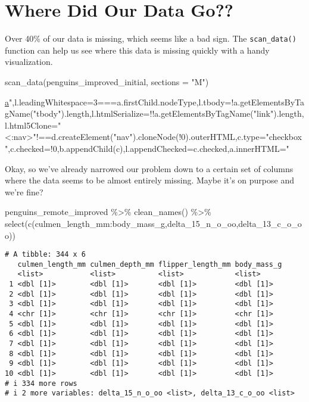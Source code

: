 \documentclass[
  letterpaper,
  DIV=11,
  numbers=noendperiod]{scrreprt}
\newenvironment{Shaded}{\begin{snugshade}}{\end{snugshade}}
\newcommand{\AttributeTok}[1]{\textcolor[rgb]{0.40,0.45,0.13}{#1}}
\newcommand{\FunctionTok}[1]{\textcolor[rgb]{0.28,0.35,0.67}{#1}}
\newcommand{\NormalTok}[1]{\textcolor[rgb]{0.00,0.23,0.31}{#1}}
\newcommand{\SpecialCharTok}[1]{\textcolor[rgb]{0.37,0.37,0.37}{#1}}
\newcommand{\StringTok}[1]{\textcolor[rgb]{0.13,0.47,0.30}{#1}}
\begin{document}
\hypertarget{where-did-our-data-go}{%
\section{Where Did Our Data Go??}\label{where-did-our-data-go}}

Over 40\% of our data is missing, which seems like a bad sign. The
\texttt{scan\_data()} function can help us see where this data is
missing quickly with a handy visualization.

\begin{Shaded}
\begin{Highlighting}[]
\FunctionTok{scan\_data}\NormalTok{(penguins\_improved\_initial, }\AttributeTok{sections =} \StringTok{"M"}\NormalTok{)}
\end{Highlighting}
\end{Shaded}

\href{/a}{a}",l.leadingWhitespace=3===a.firstChild.nodeType,l.tbody=!a.getElementsByTagName("tbody").length,l.htmlSerialize=!!a.getElementsByTagName("link").length,l.html5Clone="\textless:nav\textgreater"!==d.createElement("nav").cloneNode(!0).outerHTML,c.type="checkbox",c.checked=!0,b.appendChild(c),l.appendChecked=c.checked,a.innerHTML="

Okay, so we've already narrowed our problem down to a certain set of
columns where the data seems to be almost entirely missing. Maybe it's
on purpose and we're fine?

\begin{Shaded}
\begin{Highlighting}[]
\NormalTok{penguins\_remote\_improved }\SpecialCharTok{\%\textgreater{}\%} 
  \FunctionTok{clean\_names}\NormalTok{() }\SpecialCharTok{\%\textgreater{}\%} 
  \FunctionTok{select}\NormalTok{(}\FunctionTok{c}\NormalTok{(culmen\_length\_mm}\SpecialCharTok{:}\NormalTok{body\_mass\_g,delta\_15\_n\_o\_oo,delta\_13\_c\_o\_oo))}
\end{Highlighting}
\end{Shaded}

\begin{verbatim}
# A tibble: 344 x 6
   culmen_length_mm culmen_depth_mm flipper_length_mm body_mass_g
   <list>           <list>          <list>            <list>     
 1 <dbl [1]>        <dbl [1]>       <dbl [1]>         <dbl [1]>  
 2 <dbl [1]>        <dbl [1]>       <dbl [1]>         <dbl [1]>  
 3 <dbl [1]>        <dbl [1]>       <dbl [1]>         <dbl [1]>  
 4 <chr [1]>        <chr [1]>       <chr [1]>         <chr [1]>  
 5 <dbl [1]>        <dbl [1]>       <dbl [1]>         <dbl [1]>  
 6 <dbl [1]>        <dbl [1]>       <dbl [1]>         <dbl [1]>  
 7 <dbl [1]>        <dbl [1]>       <dbl [1]>         <dbl [1]>  
 8 <dbl [1]>        <dbl [1]>       <dbl [1]>         <dbl [1]>  
 9 <dbl [1]>        <dbl [1]>       <dbl [1]>         <dbl [1]>  
10 <dbl [1]>        <dbl [1]>       <dbl [1]>         <dbl [1]>  
# i 334 more rows
# i 2 more variables: delta_15_n_o_oo <list>, delta_13_c_o_oo <list>
\end{verbatim}
\end{document}
